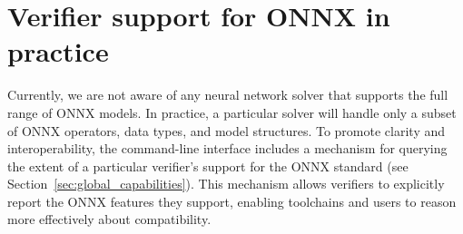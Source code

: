 \section{Verifier support for ONNX in practice}
\label{sec:onnx_support}

Currently, we are not aware of any neural network solver that supports the full range of ONNX models. In practice, a particular solver will handle only a subset of ONNX operators, data types, and model structures.
To promote clarity and interoperability, the \vnnlib{} command-line interface includes a mechanism for querying the extent of a particular verifier's support for the ONNX standard (see Section~\ref{sec:global_capabilities}). This mechanism allows verifiers to explicitly report the ONNX features they support, enabling toolchains and users to reason more effectively about compatibility.